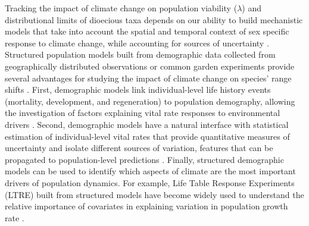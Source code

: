 \documentclass[12pt]{article}\usepackage[]{graphicx}\usepackage[dvipsnames]{xcolor}
\newcommand{\jacob}[2]{{\color{blue}{#1}}\footnote{\textit{\color{blue}{#2}}}}
\begin{document}
Tracking the impact of climate change on  population viability ($\lambda$) and distributional limits of dioecious taxa depends on our ability to build mechanistic models that take into account the spatial and temporal context of sex specific response to climate change, while accounting for sources of uncertainty \citep{davis2001range,evans2016towards}.
Structured population models built from demographic data collected from geographically distributed observations or common garden experiments provide several advantages for studying the impact of climate change on species' range shifts \citep{merow2017climate,schwinning2022common,schultz2022climate}.
First, demographic models link individual-level life history events (mortality, development, and regeneration) to population demography, allowing the investigation of factors explaining vital rate responses to environmental drivers \citep{ehrlen2015predicting,louthan2022climate,dahlgren2016demography}. 
Second, demographic models have a natural interface with %
statistical estimation of individual-level vital rates that provide quantitative measures of uncertainty and isolate different sources of variation, features that can be propagated to population-level predictions \citep{elderd2016quantifying,ellner2022critical}.
Finally, structured demographic models can be used to identify which aspects of climate are the most important drivers of population dynamics.
For example, Life Table Response Experiments (LTRE) built from structured models have become widely used to understand the relative importance of covariates in explaining variation in population growth rate  \citep{ellner2016data,hernandez2023exact,czachura2020demographic}.
\end{document}
